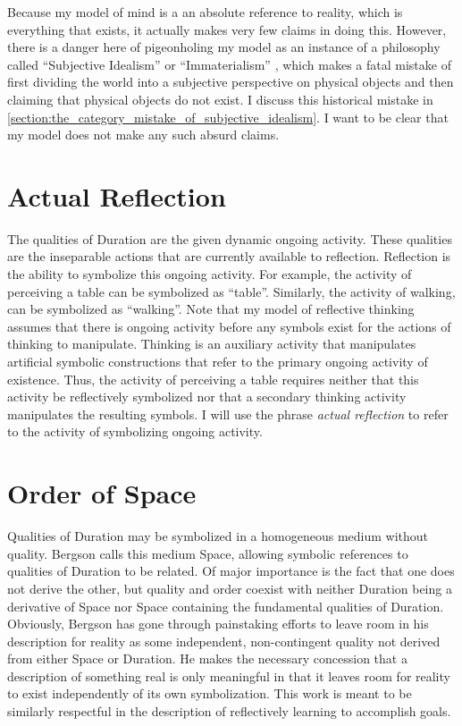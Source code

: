 Because my model of mind is a an absolute reference to reality, which
is everything that exists, it actually makes very few claims in doing
this.  However, there is a danger here of pigeonholing my model as an
instance of a philosophy called ``Subjective Idealism'' or
``Immaterialism'' \citep{berkeley:1734}, which makes a fatal mistake
of first dividing the world into a subjective perspective on physical
objects and then claiming that physical objects do not exist.  I
discuss this historical mistake in
\autoref{section:the_category_mistake_of_subjective_idealism}.  I want
to be clear that my model does not make any such absurd claims.

\section{Actual Reflection}

The qualities of Duration are the given dynamic ongoing activity.
These qualities are the inseparable actions that are currently
available to reflection.  Reflection is the ability to symbolize this
ongoing activity.  For example, the activity of perceiving a table can
be symbolized as ``table''.  Similarly, the activity of walking, can
be symbolized as ``walking''.  Note that my model of reflective
thinking assumes that there is ongoing activity before any symbols
exist for the actions of thinking to manipulate.  Thinking is an
auxiliary activity that manipulates artificial symbolic constructions
that refer to the primary ongoing activity of existence.  Thus, the
activity of perceiving a table requires neither that this activity be
reflectively symbolized nor that a secondary thinking activity
manipulates the resulting symbols.  I will use the phrase \emph{actual
  reflection} to refer to the activity of symbolizing ongoing
activity.

\section{Order of Space}

Qualities of Duration may be symbolized in a homogeneous medium
without quality.  Bergson calls this medium Space, allowing symbolic
references to qualities of Duration to be related.  Of major
importance is the fact that one does not derive the other, but quality
and order coexist with neither Duration being a derivative of Space
nor Space containing the fundamental qualities of Duration.
Obviously, Bergson has gone through painstaking efforts to leave room
in his description for reality as some independent, non-contingent
quality not derived from either Space or Duration.  He makes the
necessary concession that a description of something real is only
meaningful in that it leaves room for reality to exist independently
of its own symbolization.  This work is meant to be similarly
respectful in the description of reflectively learning to accomplish
goals.

